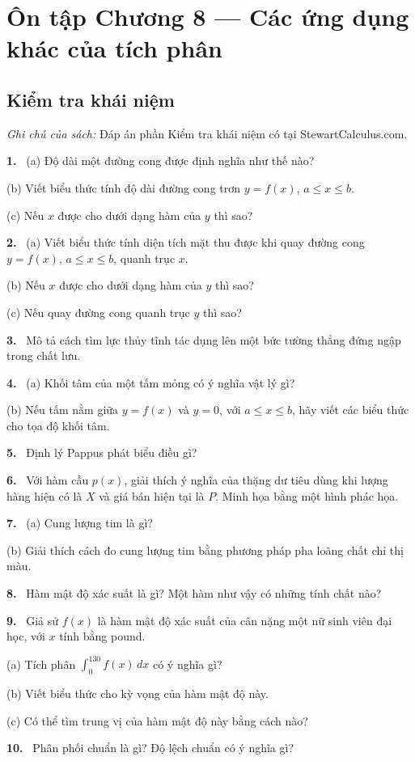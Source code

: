 \documentclass[12pt,a4paper]{article}
\newcommand{\bt}[1]{\par\smallskip\Needspace{5\baselineskip}\noindent\textbf{#1.}\ }
\newcommand{\kn}[1]{\bt{#1}}
\begin{document}
\section*{Ôn tập Chương 8 — Các ứng dụng khác của tích phân}
\subsection*{Kiểm tra khái niệm}
\textit{Ghi chú của sách:} Đáp án phần Kiểm tra khái niệm có tại StewartCalculus.com.
\kn{1} (a) Độ dài một đường cong được định nghĩa như thế nào?

(b) Viết biểu thức tính độ dài đường cong trơn $y=f(x)$, $a\le x\le b$.

(c) Nếu $x$ được cho dưới dạng hàm của $y$ thì sao?
\kn{2} (a) Viết biểu thức tính diện tích mặt thu được khi quay đường cong $y=f(x)$, $a\le x\le b$, quanh trục $x$.

(b) Nếu $x$ được cho dưới dạng hàm của $y$ thì sao?

(c) Nếu quay đường cong quanh trục $y$ thì sao?
\kn{3} Mô tả cách tìm lực thủy tĩnh tác dụng lên một bức tường thẳng đứng ngập trong chất lưu.
\kn{4} (a) Khối tâm của một tấm mỏng có ý nghĩa vật lý gì?

(b) Nếu tấm nằm giữa $y=f(x)$ và $y=0$, với $a\le x\le b$, hãy viết các biểu thức cho tọa độ khối tâm.
\kn{5} Định lý Pappus phát biểu điều gì?
\kn{6} Với hàm cầu $p(x)$, giải thích ý nghĩa của thặng dư tiêu dùng khi lượng hàng hiện có là $X$ và giá bán hiện tại là $P$. Minh họa bằng một hình phác họa.
\kn{7} (a) Cung lượng tim là gì?

(b) Giải thích cách đo cung lượng tim bằng phương pháp pha loãng chất chỉ thị màu.
\kn{8} Hàm mật độ xác suất là gì? Một hàm như vậy có những tính chất nào?
\kn{9} Giả sử $f(x)$ là hàm mật độ xác suất của cân nặng một nữ sinh viên đại học, với $x$ tính bằng pound.

(a) Tích phân $\displaystyle\int_{0}^{130}f(x)\,dx$ có ý nghĩa gì?

(b) Viết biểu thức cho kỳ vọng của hàm mật độ này.

(c) Có thể tìm trung vị của hàm mật độ này bằng cách nào?
\kn{10} Phân phối chuẩn là gì? Độ lệch chuẩn có ý nghĩa gì?
\end{document}
